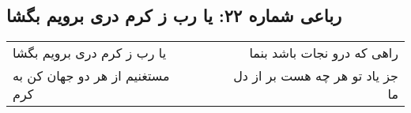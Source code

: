 \begin{center}
\section*{رباعی شماره ۲۲: یا رب ز کرم دری برویم بگشا}
\label{sec:sh022}
\begin{longtable}{l p{0.5cm} r}
یا رب ز کرم دری برویم بگشا
&&
راهی که درو نجات باشد بنما
\\
مستغنیم از هر دو جهان کن به کرم
&&
جز یاد تو هر چه هست بر از دل ما
\\
\end{longtable}
\end{center}
